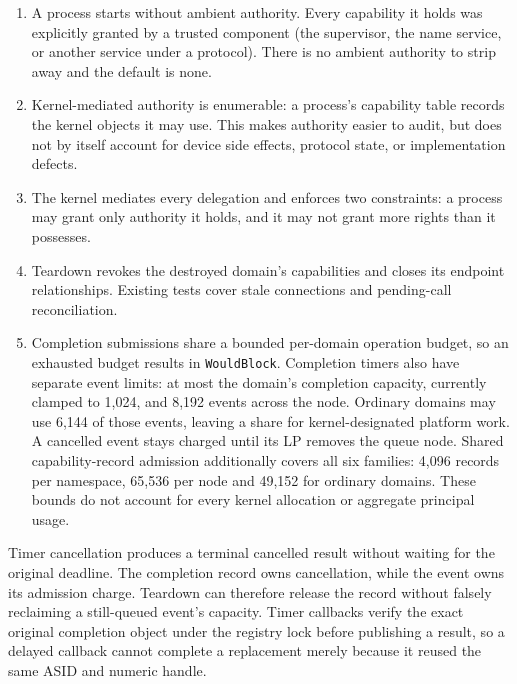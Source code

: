 \begin{enumerate}
    \item A process starts without ambient authority. Every capability it
        holds was explicitly granted by a trusted component (the supervisor,
        the name service, or another service under a protocol). There is no
        ambient authority to strip away and the default is none.

    \item Kernel-mediated authority is enumerable: a process's capability table
        records the kernel objects it may use. This makes authority easier to
        audit, but does not by itself account for device side effects, protocol
        state, or implementation defects.

    \item The kernel mediates every delegation and enforces two constraints:
        a process may grant only authority it holds, and it may not grant
        more rights than it possesses.

    \item Teardown revokes the destroyed domain's capabilities and closes its
        endpoint relationships. Existing tests cover stale connections and
        pending-call reconciliation.

    \item Completion submissions share a bounded per-domain operation budget, so
        an exhausted budget results in \texttt{WouldBlock}. Completion timers
        also have separate event limits: at most the domain's completion capacity,
        currently clamped to 1,024, and 8,192 events across the node. Ordinary
        domains may use 6,144 of those events, leaving a share for kernel-designated
        platform work. A cancelled event stays charged until its LP removes
        the queue node. Shared capability-record admission additionally covers
        all six families: 4,096 records per namespace, 65,536 per node and
        49,152 for ordinary domains. These bounds do not account for every
        kernel allocation or aggregate principal usage.
\end{enumerate}

Timer cancellation produces a terminal cancelled result without waiting for
the original deadline. The completion record owns cancellation, while the
event owns its admission charge. Teardown can therefore release the record
without falsely reclaiming a still-queued event's capacity. Timer callbacks
verify the exact original completion object under the registry lock before
publishing a result, so a delayed callback cannot complete a replacement merely
because it reused the same ASID and numeric handle.

\endinput
